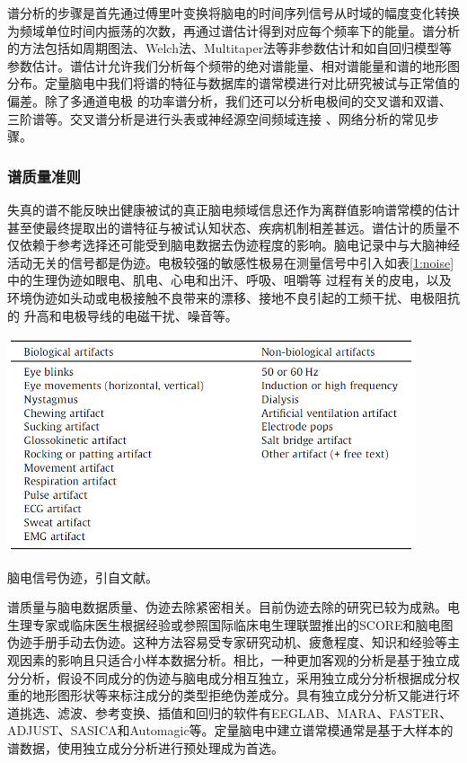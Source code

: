 谱分析的步骤是首先通过傅里叶变换将脑电的时间序列信号从时域的幅度变化转换为频域单位时间内振荡的次数，再通过谱估计得到对应每个频率下的能量。谱分析的方法包括如周期图法、Welch法、Multitaper法等非参数估计和如自回归模型等参数估计。谱估计允许我们分析每个频带的绝对谱能量、相对谱能量和谱的地形图分布。定量脑电中我们将谱的特征与数据库的谱常模进行对比研究被试与正常值的偏差。除了多通道电极
的功率谱分析，我们还可以分析电极间的交叉谱和双谱、三阶谱等。交叉谱分析是进行头表或神经源空间频域连接
、网络分析的常见步骤。

\subsubsection{谱质量准则}
失真的谱不能反映出健康被试的真正脑电频域信息还作为离群值影响谱常模的估计甚至使最终提取出的谱特征与被试认知状态、疾病机制相差甚远。谱估计的质量不仅依赖于参考选择还可能受到脑电数据去伪迹程度的影响。脑电记录中与大脑神经活动无关的信号都是伪迹。电极较强的敏感性极易在测量信号中引入如表\ref{1:noise}中的生理伪迹如眼电、肌电、心电和出汗、呼吸、咀嚼等
过程有关的皮电，以及环境伪迹如头动或电极接触不良带来的漂移、接地不良引起的工频干扰、电极阻抗的
升高和电极导线的电磁干扰、噪音等。
\begin{table}[!h]
	\includegraphics[width=12cm]{pic/xulun/EEGnoise.png}
	\caption{脑电信号伪迹，引自文献。}
	\label{1:noise}
\end{table}

谱质量与脑电数据质量、伪迹去除紧密相关。目前伪迹去除的研究已较为成熟。电生理专家或临床医生根据经验或参照国际临床电生理联盟推出的SCORE和脑电图伪迹手册手动去伪迹。这种方法容易受专家研究动机、疲惫程度、知识和经验等主观因素的影响且只适合小样本数据分析。相比，一种更加客观的分析是基于独立成分分析，假设不同成分的伪迹与脑电成分相互独立，采用独立成分分析根据成分权重的地形图形状等来标注成分的类型拒绝伪差成分。具有独立成分分析又能进行坏道挑选、滤波、参考变换、插值和回归的软件有EEGLAB、MARA、FASTER、ADJUST、SASICA和Automagic等。定量脑电中建立谱常模通常是基于大样本的谱数据，使用独立成分分析进行预处理成为首选。

